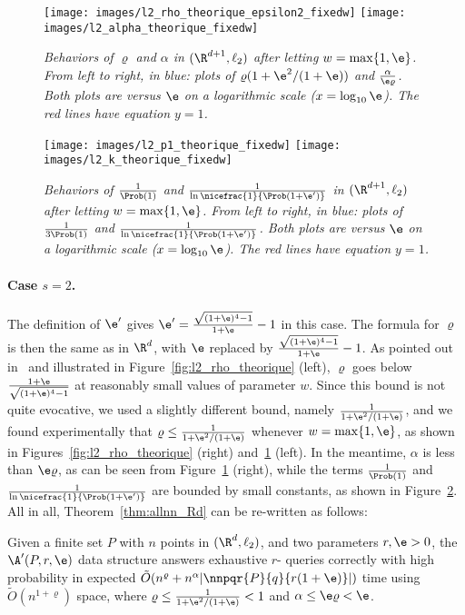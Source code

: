 \begin{figure}[!htb]
\centering
\texttt{[image: images/l2\_rho\_theorique\_epsilon2\_fixedw]}
\texttt{[image: images/l2\_alpha\_theorique\_fixedw]}
\caption{\em Behaviors of $\varrho$ and $\alpha$ in $(\R^{d+1},
  \ell_2)$ after letting $w=\max\{1,\e\}$. From left to right, in
  blue: plots of $\varrho (1+\e^2/(1+\e))$ and
  $\frac{\alpha}{\e\varrho}$. Both plots are versus
  $\e$ on a logarithmic scale ($x=\log_{10} \e$). The red lines have
  equation $y=1$.}
\label{fig:l2_rho_alpha}
\end{figure}

\begin{figure}[!htb]
\centering
\texttt{[image: images/l2\_p1\_theorique\_fixedw]}
\texttt{[image: images/l2\_k\_theorique\_fixedw]}
\caption{\em Behaviors of $\frac{1}{\Prob(1)}$ and
  $\frac{1}{\ln\nicefrac{1}{\Prob(1+\e')}}$ in $(\R^{d+1}, \ell_2)$ after
  letting $w=\max\{1,\e\}$. From left to right, in blue: plots of
  $\frac{1}{3\Prob(1)}$ and
  $\frac{1}{\ln\nicefrac{1}{\Prob(1+\e')}}$. Both plots are versus
  $\e$ on a logarithmic scale ($x=\log_{10} \e$). The red lines have
  equation $y=1$.}
\label{fig:l2_p2_k}
\end{figure}

\paragraph{Case $s=2$.}
The definition of $\e'$ gives $\e'=\frac{\sqrt{(1+\e)^4-1}}{1+\e}-1$
in this case. The formula for $\varrho$ is then the same as in $\R^d$,
with $\e$ replaced by $\frac{\sqrt{(1+\e)^4-1}}{1+\e}-1$. As pointed
out in~\cite{DIIM04} and illustrated in
Figure~\ref{fig:l2_rho_theorique} (left), $\varrho$ goes below
$\frac{1+\e}{\sqrt{(1+\e)^4-1}}$ at reasonably small values of
parameter $w$. Since this bound is not quite evocative, we used a
slightly different bound, namely $\frac{1}{1+\e^2/(1+\e)}$, and we
found experimentally that $\varrho\leq \frac{1}{1+\e^2/(1+\e)}$
whenever $w=\max\{1,\e\}$, as shown in
Figures~\ref{fig:l2_rho_theorique} (right) and~\ref{fig:l2_rho_alpha}
(left). In the meantime, $\alpha$ is less than $\e\varrho$, as can be
seen from Figure~\ref{fig:l2_rho_alpha} (right), while the terms
$\frac{1}{\Prob(1)}$ and $\frac{1}{\ln\nicefrac{1}{\Prob(1+\e')}}$ are bounded
by small constants, as shown in Figure~\ref{fig:l2_p2_k}. All in all,
Theorem~\ref{thm:allnn_Rd} can be re-written as follows:
\addtocounter{thm}{-1}
\begin{thm}[case $s=2$] \label{thm:allnn_Rd_l2}
  Given a finite set $P$ with $n$ points in $(\R^d, \ell_2)$, and two
  parameters $r,\e> 0$, the $\A'(P, r, \e)$ data
    structure answers exhaustive $r$-\pleb
  queries correctly with high probability in expected $\tilde
  O(n^\varrho+ n^\alpha|\nnpqr{P}{q}{r(1+\e)}|)$ time using
    $\tilde O(n^{1+\varrho})$ space, where $\varrho\leq
    \frac{1}{1+\e^2/(1+\e)}<1$ and $\alpha\leq
    \e\varrho < \e$.
\end{thm}




